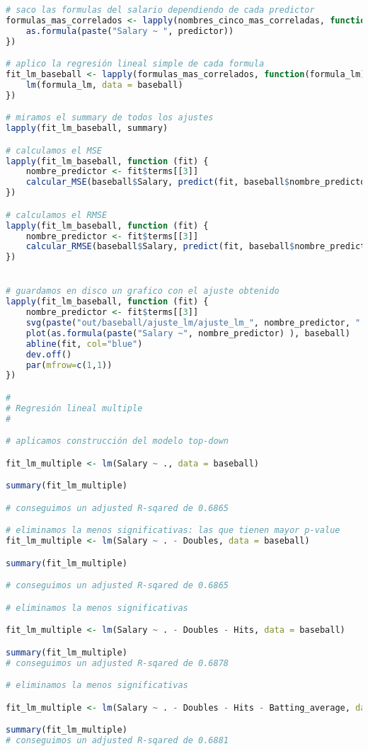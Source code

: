 \begin{lstlisting}[language=R]
# saco las formulas del salario dependiendo de cada predictor
formulas_mas_correlados <- lapply(nombres_cinco_mas_correladas, function(predictor) {
	as.formula(paste("Salary ~ ", predictor))
})

# aplico la regresión lineal simple de cada formula
fit_lm_baseball <- lapply(formulas_mas_correlados, function(formula_lm) {
	lm(formula_lm, data = baseball)
})

# miramos el summary de todos los ajustes
lapply(fit_lm_baseball, summary)

# calculamos el MSE
lapply(fit_lm_baseball, function (fit) {
	nombre_predictor <- fit$terms[[3]]
	calcular_MSE(baseball$Salary, predict(fit, baseball$nombre_predictor))
})

# calculamos el RMSE
lapply(fit_lm_baseball, function (fit) {
	nombre_predictor <- fit$terms[[3]]
	calcular_RMSE(baseball$Salary, predict(fit, baseball$nombre_predictor))
})


# guardamos en disco un grafico con el ajuste obtenido
lapply(fit_lm_baseball, function (fit) {
	nombre_predictor <- fit$terms[[3]]
	svg(paste("out/baseball/ajuste_lm/ajuste_lm_", nombre_predictor, ".svg", sep = ""))
	plot(as.formula(paste("Salary ~", nombre_predictor) ), baseball)
	abline(fit, col="blue")
	dev.off()
	par(mfrow=c(1,1))
})

#
# Regresión lineal multiple
#

# aplicamos construcción del modelo top-down

fit_lm_multiple <- lm(Salary ~ ., data = baseball)

summary(fit_lm_multiple)

# conseguimos un adjusted R-sqared de 0.6865

# eliminamos la menos significativas: las que tienen mayor p-value
fit_lm_multiple <- lm(Salary ~ . - Doubles, data = baseball)

summary(fit_lm_multiple)

# conseguimos un adjusted R-sqared de 0.6865

# eliminamos la menos significativas

fit_lm_multiple <- lm(Salary ~ . - Doubles - Hits, data = baseball)

summary(fit_lm_multiple)
# conseguimos un adjusted R-sqared de 0.6878

# eliminamos la menos significativas

fit_lm_multiple <- lm(Salary ~ . - Doubles - Hits - Batting_average, data = baseball)

summary(fit_lm_multiple)
# conseguimos un adjusted R-sqared de 0.6881


\end{lstlisting}
